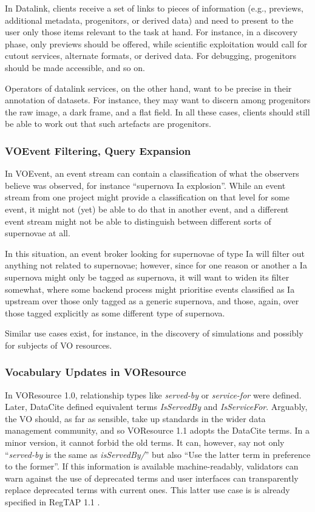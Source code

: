 \documentclass[11pt,a4paper]{ivoa}
\newcommand{\vocterm}[1]{\emph{\color{termcolor}#1}}
\begin{document}
In Datalink, clients receive a set of links
to pieces of information (e.g., previews, additional metadata,
progenitors, or
derived data) and need to present to the user only those items
relevant to the task at hand.  For instance, in a discovery phase, only
previews should be offered, while scientific exploitation would call for
cutout services, alternate formats, or derived data.  For debugging,
progenitors should be made accessible, and so on.

Operators of datalink services, on the other hand, want to be precise in
their annotation of datasets.  For instance, they may want to discern
among progenitors the raw image, a dark frame, and a flat field.  In all
these cases, clients should still be able to work out that such
artefacts are progenitors.

\subsubsection{VOEvent Filtering, Query Expansion}
\label{uc:filtering}

In VOEvent, an event stream can contain a classification of what the
observers believe was observed, for instance ``supernova Ia explosion''.
While an event stream from one project might provide a classification on
that level for some event, it might not (yet) be able to do that in
another event, and a different event stream might not be able to
distinguish between different sorts of supernovae at all.

In this situation, an event broker looking for supernovae of type Ia
will filter out anything not related to supernovae; however, since for
one reason or another a Ia supernova might only be tagged as supernova,
it will want to widen its filter somewhat, where some backend process
might prioritise events classified as Ia upstream over those only tagged
as a generic supernova, and those, again, over those tagged explicitly
as some different type of supernova.

Similar use cases exist, for instance, in the discovery of simulations
and possibly for subjects of VO resources.


\subsubsection{Vocabulary Updates in VOResource}
\label{uc:deprecation}

In VOResource 1.0, relationship types like \vocterm{served-by} or
\vocterm{service-for} were defined.  Later, DataCite defined equivalent
terms \vocterm{IsServedBy} and \vocterm{IsServiceFor}.  Arguably, the VO should,
as far as sensible, take up standards in the wider data management
community, and so VOResource 1.1 adopts the DataCite terms.  In a minor
version, it cannot forbid the old terms.  It can, however, say not only
``\vocterm{served-by\/} is the same as \vocterm{isServedBy/}'' but also
``Use the latter term in preference to the former''.  If this information is
available machine-readably, validators can warn against the use of
deprecated terms and user interfaces can transparently replace 
deprecated terms with current ones.  This latter use case is is
already specified in RegTAP 1.1 \citep{2019ivoa.spec.1011D}.
\end{document}
